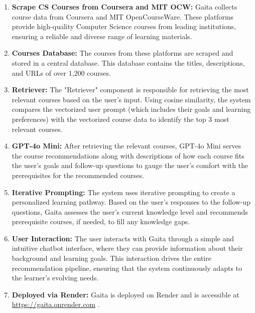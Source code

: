 \begin{enumerate}
\item \textbf{Scrape CS Courses from Coursera and MIT OCW:} Gaita collects course data from Coursera and MIT OpenCourseWare. These platforms provide high-quality Computer Science courses from leading institutions, ensuring a reliable and diverse range of learning materials.  

\item \textbf{Courses Database:} The courses from these platforms are scraped and stored in a central database. This database contains the titles, descriptions, and URLs of over 1,200 courses.

\item \textbf{Retriever:} The "Retriever" component is responsible for retrieving the most relevant courses based on the user’s input. Using cosine similarity, the system compares the vectorized user prompt (which includes their goals and learning preferences) with the vectorized course data to identify the top 3 most relevant courses.


\item \textbf{GPT-4o Mini:} After retrieving the relevant courses, GPT-4o Mini serves the course recommendations along with descriptions of how each course fits the user’s goals and follow-up questions to gauge the user's comfort with the prerequisites for the recommended courses. 

\item \textbf{Iterative Prompting:} The system uses iterative prompting to create a personalized learning pathway. Based on the user's responses to the follow-up questions, Gaita assesses the user’s current knowledge level and recommends prerequisite courses, if needed, to fill any knowledge gaps. 

\item \textbf{User Interaction:} The user interacts with Gaita through a simple and intuitive chatbot interface, where they can provide information about their background and learning goals. This interaction drives the entire recommendation pipeline, ensuring that the system continuously adapts to the learner's evolving needs.

\item \textbf{Deployed via Render:} Gaita is deployed on Render and is accessible at \url{https://gaita.onrender.com} \footnotemark[1]. 

\end{enumerate}


